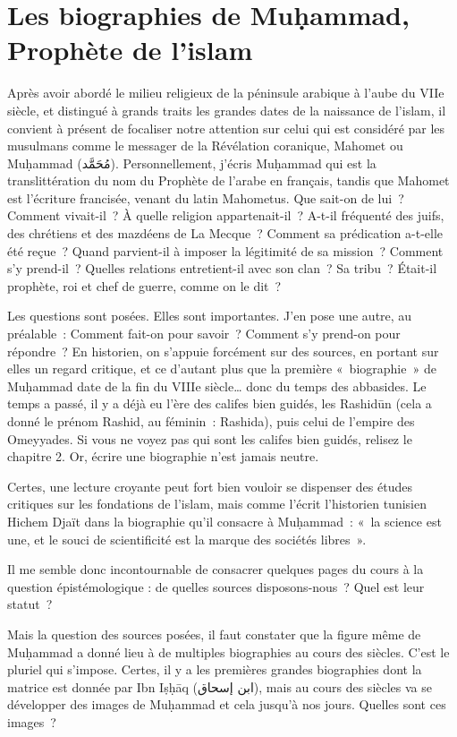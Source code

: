 \chapter{Les biographies de Muḥammad, Prophète de l'islam}

Après avoir abordé le milieu religieux de la péninsule arabique à l'aube
du VIIe siècle, et distingué à grands traits les grandes dates de la
naissance de l'islam, il convient à présent de focaliser notre attention
sur celui qui est considéré par les musulmans comme le messager de la
Révélation coranique, Mahomet ou Muḥammad (مُحَمَّد). Personnellement,
j'écris Muḥammad qui est la translittération du nom du Prophète de
l'arabe en français, tandis que Mahomet est l'écriture francisée, venant
du latin Mahometus. Que sait-on de lui~? Comment vivait-il~? À quelle
religion appartenait-il~? A-t-il fréquenté des juifs, des chrétiens et
des mazdéens de La Mecque~? Comment sa prédication a-t-elle été reçue~?
Quand parvient-il à imposer la légitimité de sa mission~? Comment s'y
prend-il~? Quelles relations entretient-il avec son clan~? Sa tribu~?
Était-il prophète, roi et chef de guerre, comme on le dit~?

Les questions sont posées. Elles sont importantes. J'en pose une autre,
au préalable~: Comment fait-on pour savoir~? Comment s'y prend-on pour
répondre~? En historien, on s'appuie forcément sur des sources, en
portant sur elles un regard critique, et ce d'autant plus que la
première «~biographie~» de Muḥammad date de la fin du VIIIe
siècle\ldots{} donc du temps des abbasides. Le temps a passé, il y a
déjà eu l'ère des califes bien guidés, les Rashidūn (cela a donné le
prénom Rashid, au féminin~: Rashida), puis celui de l'empire des
Omeyyades. Si vous ne voyez pas qui sont les califes bien guidés,
relisez le chapitre 2. Or, écrire une biographie n'est jamais neutre.

Certes, une lecture croyante peut fort bien vouloir se dispenser des
études critiques sur les fondations de l'islam, mais comme l'écrit
l'historien tunisien Hichem Djaït dans la biographie qu'il consacre à
Muḥammad~: «~la science est une, et le souci de scientificité est la
marque des sociétés libres~».

Il me semble donc incontournable de consacrer quelques pages du cours à
la question épistémologique : de quelles sources disposons-nous~? Quel
est leur statut~?

Mais la question des sources posées, il faut constater que la figure
même de Muḥammad a donné lieu à de multiples biographies au cours des
siècles. C'est le pluriel qui s'impose. Certes, il y a les premières
grandes biographies dont la matrice est donnée par Ibn Iṣḥāq (ابن
إسحاق), mais au cours des siècles va se développer des images de
Muḥammad et cela jusqu'à nos jours. Quelles sont ces images~?

